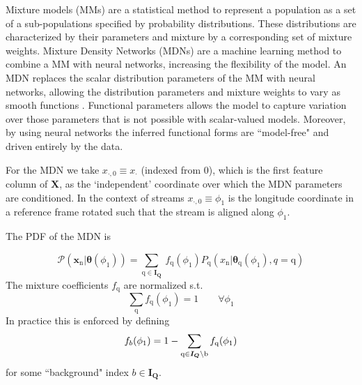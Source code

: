 \documentclass[twocolumn]{aastex631}
\newcommand{\mrm}[1]{\mathrm{#1}}
\newcommand{\mbs}[1]{\boldsymbol{#1}}
\newcommand{\mbf}[1]{\mathbf{#1}}
\newcommand{\mcal}[1]{\mathcal{#1}}
\newcommand{\pdf}{\mcal{P}}
\newcommand{\nth}[1]{{#1}_{\mrm{n}}}  %
\newcommand{\qth}[1]{{#1}_{\mrm{q}}}  %
\begin{document}
    Mixture models (MMs) are a statistical method to represent a population as a set of a sub-populations specified by probability distributions. These distributions are characterized by their parameters and mixture by a corresponding set of mixture weights. Mixture Density Networks (MDNs) 
    are a machine learning method to combine a MM with neural networks, increasing the flexibility of the model. An MDN replaces the scalar distribution parameters of the MM with neural networks, allowing the distribution parameters and mixture weights to vary as smooth functions \citep{Bishop1994}. Functional parameters allows the model to capture variation over those parameters that is not possible with scalar-valued models. Moreover, by using neural networks the inferred functional forms are ``model-free" and driven entirely by the data.


    For the MDN we take $x_{\cdot, 0} \equiv x_{\cdot}$ (indexed from 0), which is the first feature column of $\mbf{X}$, as the `independent' coordinate over which the MDN parameters are conditioned. In the context of streams $x_{\cdot, 0} \equiv \phi_1$ is the longitude coordinate in a reference frame rotated such that the stream is aligned along $\phi_1$.

    The PDF of the MDN is

    \begin{equation} \label{eq:general_mixture_network}
        \pdf(\nth{\mbs{x}} | \mbs{\theta}(\phi_1))
        = \sum_{\mrm{q} \in \mbs{I_Q}} \ \qth{f}(\phi_1) \qth{P}(\nth{x}|\qth{\mbs{\theta}}(\phi_1),q\!=\!\mrm{q})
    \end{equation}
    The mixture coefficients $\qth{f}$ are normalized s.t.
    \begin{equation}
        \sum_{\mrm{q}} \qth{f}(\phi_1) = 1 \qquad \forall \phi_1
    \end{equation}
    In practice this is enforced by defining
    \begin{equation}
        f_{b}(\phi_1) = 1 - \sum_{\rm{q}\in \mbs{I_Q}\backslash b} \qth{f}(\phi_1)
    \end{equation}
    for some ``background" index $b \in \mbs{I_Q}$.
\end{document}
